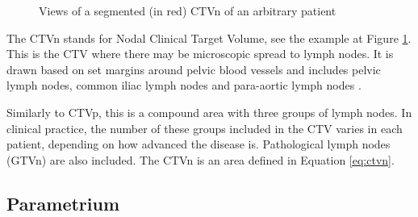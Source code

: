 \documentclass[11pt,twoside]{report}
\begin{document}
\begin{figure}[H]
  \centering
  \caption{Views of a segmented (in red) CTVn of an arbitrary patient}
  \label{fig:example-CTVn}
\end{figure}

The CTVn stands for Nodal Clinical Target Volume, see the example at Figure \ref{fig:example-CTVn}. This is the CTV where there may be microscopic spread to lymph nodes. It is drawn based on set margins around pelvic blood vessels and includes pelvic lymph nodes, common iliac lymph nodes and para-aortic lymph nodes \cite{AMLART-data}. 

Similarly to CTVp, this is a compound area with three groups of lymph nodes. In clinical practice, the number of these groups included in the CTV varies in each patient, depending on how advanced the disease is. Pathological lymph nodes (GTVn) are also included. The CTVn is an area defined in Equation \ref{eq:ctvn}.

\subsection{Parametrium}\label{sec:data-Parametrium}
\end{document}

